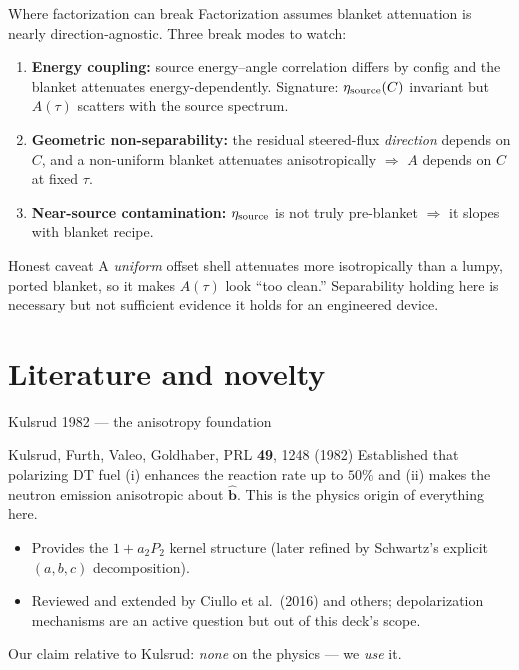 \documentclass[aspectratio=169]{beamer}
\newcommand{\bb}{\hat{\bm b}}
\begin{document}
\begin{frame}[t]{Where factorization can break}
Factorization assumes blanket attenuation is nearly direction-agnostic. Three break modes to watch:
\begin{enumerate}
  \item \textbf{Energy coupling:} source energy--angle correlation differs by config and the blanket attenuates energy-dependently. Signature: $\eta_{\rm source}(C)$ invariant but $A(\tau)$ scatters with the source spectrum.
  \item \textbf{Geometric non-separability:} the residual steered-flux \emph{direction} depends on $C$, and a non-uniform blanket attenuates anisotropically $\Rightarrow$ $A$ depends on $C$ at fixed $\tau$.
  \item \textbf{Near-source contamination:} $\eta_{\rm source}$ is not truly pre-blanket $\Rightarrow$ it slopes with blanket recipe.
\end{enumerate}
\begin{block}{Honest caveat}
A \emph{uniform} offset shell attenuates more isotropically than a lumpy, ported blanket, so it makes $A(\tau)$ look ``too clean.'' Separability holding here is necessary but not sufficient evidence it holds for an engineered device.
\end{block}
\end{frame}

\section{Literature and novelty}

\begin{frame}[t]{Kulsrud 1982 --- the anisotropy foundation}
\begin{block}{Kulsrud, Furth, Valeo, Goldhaber, PRL \textbf{49}, 1248 (1982)}
Established that polarizing DT fuel (i) enhances the reaction rate up to $50\%$ and (ii) makes the neutron emission anisotropic about $\bb$. This is the physics origin of everything here.
\end{block}
\begin{itemize}
  \item Provides the $1+a_2P_2$ kernel structure (later refined by Schwartz's explicit $(a,b,c)$ decomposition).
  \item Reviewed and extended by Ciullo et al.\ (2016) and others; depolarization mechanisms are an active question but out of this deck's scope.
\end{itemize}
Our claim relative to Kulsrud: \emph{none} on the physics --- we \emph{use} it.
\end{frame}
\end{document}
